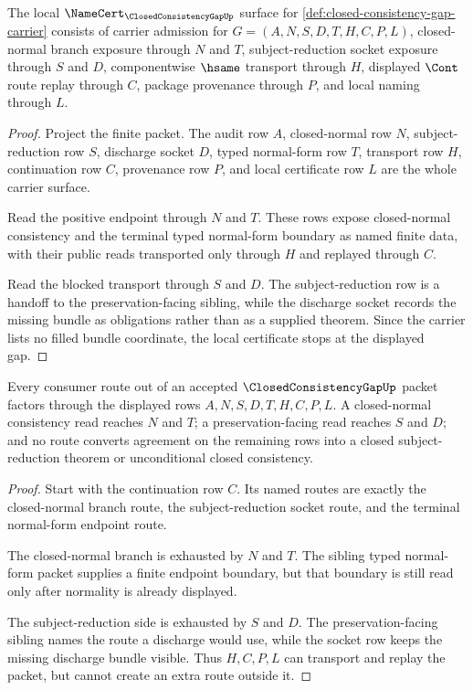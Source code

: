 \begin{theorem}
\label{thm:closed-consistency-gap-namecert-obligations}
The local $\NameCert_{\ClosedConsistencyGapUp}$ surface for \autoref{def:closed-consistency-gap-carrier} consists of carrier admission for $G=(A,N,S,D,T,H,C,P,L)$, closed-normal branch exposure through $N$ and $T$, subject-reduction socket exposure through $S$ and $D$, componentwise $\hsame$ transport through $H$, displayed $\Cont$ route replay through $C$, package provenance through $P$, and local naming through $L$.
\end{theorem}
\begin{proof}
Project the finite packet. The audit row $A$, closed-normal row $N$, subject-reduction row $S$, discharge socket $D$, typed normal-form row $T$, transport row $H$, continuation row $C$, provenance row $P$, and local certificate row $L$ are the whole carrier surface.

Read the positive endpoint through $N$ and $T$. These rows expose closed-normal consistency and the terminal typed normal-form boundary as named finite data, with their public reads transported only through $H$ and replayed through $C$.

Read the blocked transport through $S$ and $D$. The subject-reduction row is a handoff to the preservation-facing sibling, while the discharge socket records the missing bundle as obligations rather than as a supplied theorem. Since the carrier lists no filled bundle coordinate, the local certificate stops at the displayed gap.
\end{proof}

\begin{theorem}
\label{thm:closed-consistency-gap-route-exhaustion}
Every consumer route out of an accepted $\ClosedConsistencyGapUp$ packet factors through the displayed rows $A,N,S,D,T,H,C,P,L$. A closed-normal consistency read reaches $N$ and $T$; a preservation-facing read reaches $S$ and $D$; and no route converts agreement on the remaining rows into a closed subject-reduction theorem or unconditional closed consistency.
\end{theorem}
\begin{proof}
Start with the continuation row $C$. Its named routes are exactly the closed-normal branch route, the subject-reduction socket route, and the terminal normal-form endpoint route.

The closed-normal branch is exhausted by $N$ and $T$. The sibling typed normal-form packet supplies a finite endpoint boundary, but that boundary is still read only after normality is already displayed.

The subject-reduction side is exhausted by $S$ and $D$. The preservation-facing sibling names the route a discharge would use, while the socket row keeps the missing discharge bundle visible. Thus $H,C,P,L$ can transport and replay the packet, but cannot create an extra route outside it.
\end{proof}

